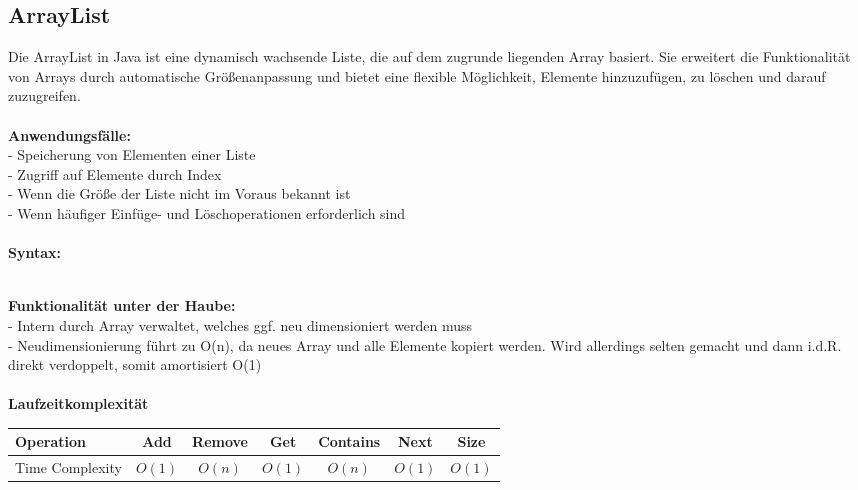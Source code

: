 \documentclass[../main.tex]{subfiles}
\begin{document}
		\subsection{ArrayList}
		Die ArrayList in Java ist eine dynamisch wachsende Liste, die auf dem zugrunde liegenden Array basiert.
		Sie erweitert die Funktionalität von Arrays durch automatische Größenanpassung und bietet eine flexible Möglichkeit, Elemente hinzuzufügen, zu löschen und darauf zuzugreifen. \\\\
		\textbf{Anwendungsfälle:}\\
		- Speicherung von Elementen einer Liste\\
		- Zugriff auf Elemente durch Index\\
		- Wenn die Größe der Liste nicht im Voraus bekannt ist\\ 
		- Wenn häufiger Einfüge- und Löschoperationen erforderlich sind\\\\
		\textbf{Syntax:}
		 
		\\
		\textbf{Funktionalität unter der Haube:}\\
		- Intern durch Array verwaltet, welches ggf. neu dimensioniert werden muss\\
		- Neudimensionierung führt zu O(n), da neues Array und alle Elemente kopiert werden. Wird allerdings selten gemacht und dann i.d.R. direkt verdoppelt, somit amortisiert O(1)\\\\
		\textbf{Laufzeitkomplexität}\\
		\begin{table}[ht]
			\centering
			\begin{tabular}{l *{6}{c}}
				\toprule
				Operation & Add & Remove & Get & Contains & Next & Size \\
				\midrule
				Time Complexity & $O(1)$ & $O(n)$ & $O(1)$ & $O(n)$ & $O(1)$ & $O(1)$ \\
				\bottomrule
			\end{tabular}
		\end{table}
		\clearpage
		
		
\end{document}
